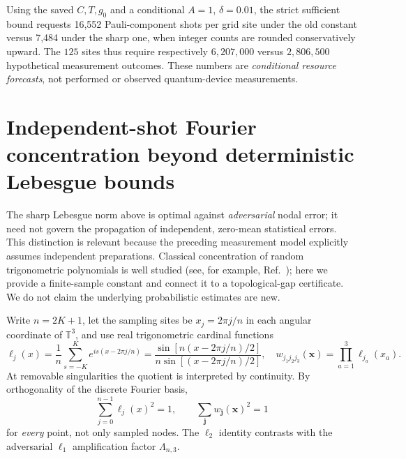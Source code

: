 \documentclass[aps,prd,onecolumn,notitlepage,11pt,superscriptaddress,longbibliography]{revtex4-2}
\begin{document}
Using the saved $C,T,g_0$ and a conditional $A=1$, $\delta=0.01$,
the strict sufficient bound requests 16,552 Pauli-component shots
per grid site under the old constant versus 7,484 under the sharp
one, when integer counts are rounded conservatively upward.
The $125$ sites thus require respectively $6{,}207{,}000$ versus
$2{,}806{,}500$ hypothetical measurement outcomes. These numbers
are \emph{conditional resource forecasts}, not performed or
observed quantum-device measurements.


\section{Independent-shot Fourier concentration beyond deterministic Lebesgue bounds}
\label{sec:stochastic}
The sharp Lebesgue norm above is optimal against \emph{adversarial} nodal error; it need not govern the propagation of independent, zero-mean statistical errors. This distinction is relevant because the preceding measurement model explicitly assumes independent preparations. Classical concentration of random trigonometric polynomials is well studied (see, for example, Ref.~\cite{BenkeHendricks1993}); here we provide a finite-sample constant and connect it to a topological-gap certificate. We do not claim the underlying probabilistic estimates are new.

Write $n=2K+1$, let the sampling sites be $x_j=2\pi j/n$ in each angular coordinate of $\mathbb T^3$, and use real trigonometric cardinal functions
\begin{equation}
\ell_j(x)=\frac1n\sum_{s=-K}^K e^{is(x-2\pi j/n)}
=\frac{\sin[n(x-2\pi j/n)/2]}{n\sin[(x-2\pi j/n)/2]},\quad
w_{j_1j_2j_3}(\bm x)=\prod_{a=1}^3\ell_{j_a}(x_a).
\end{equation}
At removable singularities the quotient is interpreted by continuity. By orthogonality of the discrete Fourier basis,
\begin{equation}\label{eq:cardinal-frame}
\boxed{\quad\sum_{j=0}^{n-1}\ell_j(x)^2=1,
\qquad\sum_{\bm j}w_{\bm j}(\bm x)^2=1\quad}
\end{equation}
for \emph{every} point, not only sampled nodes. The $\ell_2$ identity contrasts with the adversarial $\ell_1$ amplification factor $\Lambda_{n,3}$.
\end{document}
